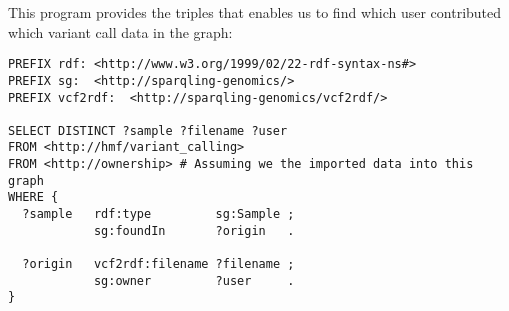   This program provides the triples that enables us to find which user
  contributed which variant call data in the graph:

\begin{siderules}
\begin{verbatim}
PREFIX rdf: <http://www.w3.org/1999/02/22-rdf-syntax-ns#>
PREFIX sg:  <http://sparqling-genomics/>
PREFIX vcf2rdf:  <http://sparqling-genomics/vcf2rdf/>

SELECT DISTINCT ?sample ?filename ?user
FROM <http://hmf/variant_calling>
FROM <http://ownership> # Assuming we the imported data into this graph
WHERE {
  ?sample   rdf:type         sg:Sample ;
            sg:foundIn       ?origin   .

  ?origin   vcf2rdf:filename ?filename ;
            sg:owner         ?user     .
}
\end{verbatim}
\end{siderules}
